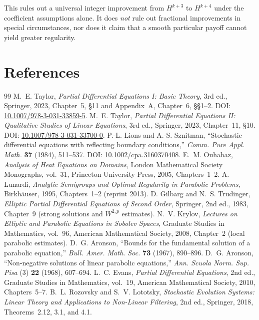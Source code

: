 \documentclass[11pt,a4paper]{article}
\theoremstyle{definition}\newtheorem{definition}{Definition}[section]\newtheorem{example}[theorem]{Example}
\theoremstyle{remark}\newtheorem{remark}[theorem]{Remark}\newtheorem{remarkSix}{Remark}[section]
\begin{document}
This rules out a universal integer improvement from $H^{k+3}$ to $H^{k+4}$ under the coefficient assumptions alone. It does \emph{not} rule out fractional improvements in special circumstances, nor does it claim that a smooth particular payoff cannot yield greater regularity.

\clearpage
\section*{References}
\begin{thebibliography}{99}\setlength{\itemsep}{4pt}
 M.~E. Taylor, \emph{Partial Differential Equations I: Basic Theory}, 3rd ed., Springer, 2023, Chapter~5, \S11 and Appendix~A, Chapter~6, \S\S1--2. DOI: \href{https://doi.org/10.1007/978-3-031-33859-5}{10.1007/978-3-031-33859-5}.
 M.~E. Taylor, \emph{Partial Differential Equations II: Qualitative Studies of Linear Equations}, 3rd ed., Springer, 2023, Chapter~11, \S10. DOI: \href{https://doi.org/10.1007/978-3-031-33700-0}{10.1007/978-3-031-33700-0}.
 P.-L. Lions and A.-S. Sznitman, ``Stochastic differential equations with reflecting boundary conditions,'' \emph{Comm. Pure Appl. Math.} \textbf{37} (1984), 511--537. DOI: \href{https://doi.org/10.1002/cpa.3160370408}{10.1002/cpa.3160370408}.
 E.~M. Ouhabaz, \emph{Analysis of Heat Equations on Domains}, London Mathematical Society Monographs, vol.~31, Princeton University Press, 2005, Chapters~1--2.
 A. Lunardi, \emph{Analytic Semigroups and Optimal Regularity in Parabolic Problems}, Birkh\"auser, 1995, Chapters~1--2 (reprint 2013).
 D. Gilbarg and N.~S. Trudinger, \emph{Elliptic Partial Differential Equations of Second Order}, Springer, 2nd ed., 1983, Chapter~9 (strong solutions and $W^{2,p}$ estimates).
 N.~V. Krylov, \emph{Lectures on Elliptic and Parabolic Equations in Sobolev Spaces}, Graduate Studies in Mathematics, vol.~96, American Mathematical Society, 2008, Chapter~2 (local parabolic estimates).
 D.~G. Aronson, ``Bounds for the fundamental solution of a parabolic equation,'' \emph{Bull. Amer. Math. Soc.} \textbf{73} (1967), 890--896.
 D.~G. Aronson, ``Non-negative solutions of linear parabolic equations,'' \emph{Ann. Scuola Norm. Sup. Pisa} (3) \textbf{22} (1968), 607--694.
 L.~C. Evans, \emph{Partial Differential Equations}, 2nd ed., Graduate Studies in Mathematics, vol.~19, American Mathematical Society, 2010, Chapters~5--7.
 B.~L. Rozovsky and S.~V. Lototsky, \emph{Stochastic Evolution Systems: Linear Theory and Applications to Non-Linear Filtering}, 2nd ed., Springer, 2018, Theorems~2.12, 3.1, and 4.1.
\end{thebibliography}
\end{document}

